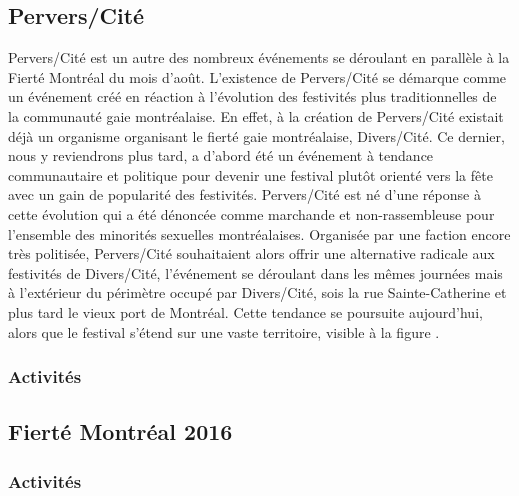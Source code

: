\subsection{Pervers/Cité}
\label{subsec:perverscite}
Pervers/Cité est un autre des nombreux événements se déroulant en parallèle à la Fierté Montréal du mois d'août.
L'existence de Pervers/Cité se démarque comme un événement créé en réaction à l'évolution des festivités plus traditionnelles de la communauté gaie montréalaise.
En effet, à la création de Pervers/Cité existait déjà un organisme organisant le fierté gaie montréalaise, Divers/Cité.
Ce dernier, nous y reviendrons plus tard, a d'abord été un événement à tendance communautaire et politique pour devenir une festival plutôt orienté vers la fête avec un gain de popularité des festivités.
Pervers/Cité est né d'une réponse à cette évolution qui a été dénoncée comme marchande et non-rassembleuse pour l'ensemble des minorités sexuelles montréalaises.
Organisée par une faction encore très politisée, Pervers/Cité souhaitaient alors offrir une alternative radicale aux festivités de Divers/Cité, l'événement se déroulant dans les mêmes journées mais à l'extérieur du périmètre occupé par Divers/Cité, sois la rue Sainte-Catherine et plus tard le vieux port de Montréal.
Cette tendance se poursuite aujourd'hui, alors que le festival s'étend sur une vaste territoire, visible à la figure .


\subsubsection{Activités}
\label{subsec:activitesperverscite}


\subsection{Fierté Montréal 2016}
\label{subsec:fiertemontreal2016}

\subsubsection{Activités}
\label{subsec:activitesfiertemontreal}



